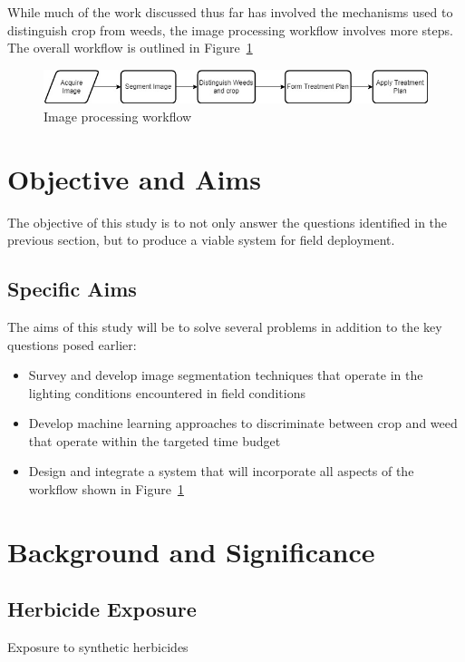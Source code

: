 \documentclass[letterpaper]{article}
\begin{document}
{While much of the work discussed thus far has involved the mechanisms used to distinguish crop from weeds, the image processing workflow involves more steps. The overall workflow is outlined in Figure~\ref{fig:image-processing-workflow}
\begin{figure}[H]
	\centering
	\includegraphics[width=0.75\linewidth]{./figures/image-processing-workflow.jpg}
	\caption{Image processing workflow}
	\label{fig:image-processing-workflow}
\end{figure}

 \newpage
 
\section{Objective and Aims}
The objective of this study is to not only answer the questions identified in the previous section, but to produce a viable system for field deployment. 

\subsection{Specific Aims}
The aims of this study will be to solve several problems in addition to the key questions posed earlier:
\begin{itemize}
	\item{Survey and develop image segmentation techniques that operate in the lighting conditions encountered in field conditions}
	\item{Develop machine learning approaches to discriminate between crop and weed that operate within the targeted time budget}
	\item{Design and integrate a system that will incorporate all aspects of the workflow shown in Figure~\ref{fig:image-processing-workflow}}
\end{itemize}
\newpage

%
%

\section{Background and Significance}

\subsection{Herbicide Exposure}
Exposure to synthetic herbicides \cite{Rydz2021-ar}
}
\end{document}
